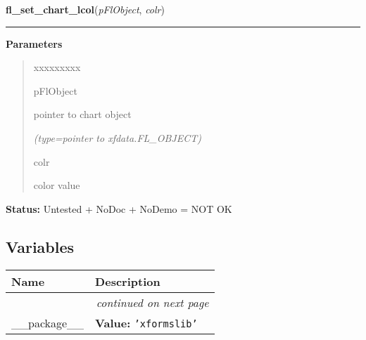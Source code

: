 \hspace{.8\funcindent}\begin{boxedminipage}{\funcwidth}

    \raggedright \textbf{fl\_set\_chart\_lcol}(\textit{pFlObject}, \textit{colr})

    \vspace{-1.5ex}

    \rule{\textwidth}{0.5\fboxrule}
\setlength{\parskip}{2ex}
\setlength{\parskip}{1ex}
      \textbf{Parameters}
      \vspace{-1ex}

      \begin{quote}
        \begin{Ventry}{xxxxxxxxx}

          \item[pFlObject]

          pointer to chart object

            {\it (type=pointer to xfdata.FL\_OBJECT)}

          \item[colr]

          color value

        \end{Ventry}

      \end{quote}

\textbf{Status:} Untested + NoDoc + NoDemo = NOT OK



    \end{boxedminipage}



  \subsection{Variables}

    \vspace{-1cm}
\hspace{\varindent}\begin{longtable}{|p{\varnamewidth}|p{\vardescrwidth}|l}
\cline{1-2}
\cline{1-2} \centering \textbf{Name} & \centering \textbf{Description}& \\
\cline{1-2}
\endhead\cline{1-2}\multicolumn{3}{r}{\small\textit{continued on next page}}\\\endfoot\cline{1-2}
\endlastfoot\raggedright \_\-\_\-p\-a\-c\-k\-a\-g\-e\-\_\-\_\- & \raggedright \textbf{Value:} 
{\tt \texttt{'}\texttt{xformslib}\texttt{'}}&\\
\cline{1-2}
\end{longtable}


